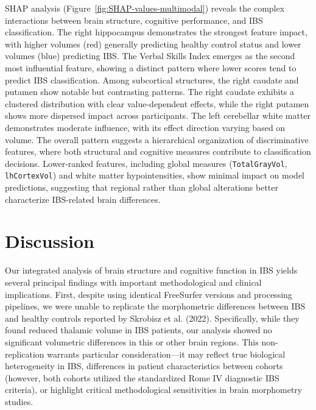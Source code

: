 \documentclass[diagnostics,article,accept,pdftex,moreauthors]{Definitions/mdpi}
\begin{document}
SHAP analysis (Figure~\ref{fig:SHAP-values-multimodal})  %
reveals the complex interactions between brain structure, cognitive performance, and IBS classification. The right hippocampus demonstrates the strongest feature impact, with higher volumes (red) generally predicting healthy control status and lower volumes (blue) predicting IBS. The Verbal Skills Index emerges as the second most influential feature, showing a distinct pattern where lower scores tend to predict IBS classification. Among subcortical structures, the right caudate and putamen show notable but contrasting patterns. The right caudate exhibits a clustered distribution with clear value-dependent effects, while the right putamen shows more dispersed impact across participants. The left cerebellar white matter demonstrates moderate influence, with its effect direction varying based on volume. The overall pattern suggests a hierarchical organization of discriminative features, where both structural and cognitive measures contribute to classification decisions. Lower-ranked features, including global measures (\texttt{TotalGrayVol}, \texttt{lhCortexVol}) and white matter hypointensities, show minimal impact on model predictions, suggesting that regional rather than global alterations better characterize IBS-related brain differences.




\section{Discussion}  

Our integrated analysis of brain structure and cognitive function in IBS yields several principal findings with important methodological and clinical implications. First, despite using identical FreeSurfer versions and processing pipelines, we were unable to replicate the morphometric differences between IBS and healthy controls reported by Skrobisz et al. (2022). Specifically, while they found reduced thalamic volume in IBS patients, our analysis showed no significant volumetric differences in this or other brain regions. This non-replication warrants particular consideration---it may reflect true biological heterogeneity in IBS, differences in patient characteristics between cohorts (however, both cohorts utilized the standardized Rome IV diagnostic IBS criteria), or highlight critical methodological sensitivities in brain morphometry studies.
\end{document}
